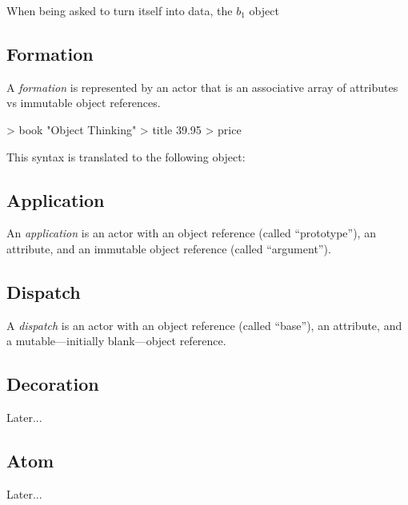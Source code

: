 When being asked to turn itself into data, the \(b_1\) object

\subsection{Formation}

A \emph{formation} is represented by an actor that is an associative array of attributes vs immutable object references.

\begin{ffcode}
[isbn] > book
  "Object Thinking" > title
  39.95 > price
\end{ffcode}

This syntax is translated to the following object:


\subsection{Application}

An \emph{application} is an actor with an object reference (called ``prototype''), an attribute, and an immutable object reference (called ``argument'').

\subsection{Dispatch}

A \emph{dispatch} is an actor with an object reference (called ``base''), an attribute, and a mutable---initially blank---object reference.


\subsection{Decoration}

Later...

\subsection{Atom}

Later...
